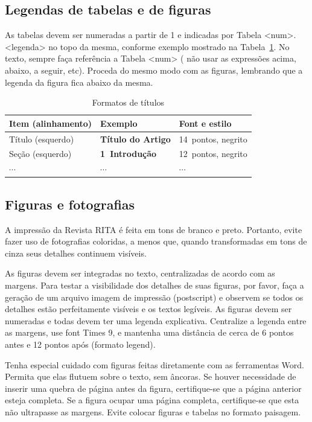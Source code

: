 \documentclass{RITA}
\begin{document}
\subsection{Legendas de tabelas e de figuras}
As tabelas devem ser numeradas a partir de 1 e indicadas por Tabela <num>. <legenda> no topo da mesma, conforme exemplo mostrado na Tabela~\ref{tab:exemplo}. No texto, sempre faça referência a Tabela <num> ( não usar as expressões acima, abaixo, a seguir, etc).  Proceda do mesmo modo com as figuras, lembrando que a legenda da figura fica abaixo da mesma.

\begin{table}
\begin{center}
\caption{Formatos de títulos}
\label{tab:exemplo}
\begin{tabular}{lll}
        \hline
	Item (alinhamento) & Exemplo & Font e estilo\\
	\hline
	Título (esquerdo) & \Large\textbf{Título do Artigo} & 14~pontos, negrito\\
	Seção (esquerdo) & \large\textbf{1~Introdução} & 12~pontos,
	negrito\\
	$\cdots$ & $\cdots$ & $\cdots$\\
	\hline
\end{tabular}
\end{center}
\end{table}

\subsection{Figuras e fotografias}
A impressão da Revista RITA é feita em tons de branco e preto. Portanto, evite fazer uso de fotografias coloridas, a menos que, quando transformadas em tons de cinza seus detalhes continuem visíveis.

As figuras devem ser integradas no texto, centralizadas de acordo com as margens. Para testar a visibilidade dos detalhes de suas figuras, por favor, faça a geração de um arquivo imagem de impressão (postscript) e observem se todos os detalhes estão perfeitamente visíveis e os textos legíveis.  As figuras devem ser numeradas e todas devem ter uma legenda explicativa. Centralize a legenda entre as margens, use font Times 9, e mantenha uma distância de cerca de 6 pontos antes e 12 pontos após (formato legend).

Tenha especial cuidado com figuras feitas diretamente com as ferramentas Word. Permita que elas flutuem sobre o texto, sem âncoras. Se houver necessidade de inserir uma quebra de página antes da figura, certifique-se que a página anterior esteja completa. Se a figura ocupar uma página completa, certifique-se que esta não ultrapasse as margens. Evite colocar figuras e tabelas no formato paisagem.
\end{document}
